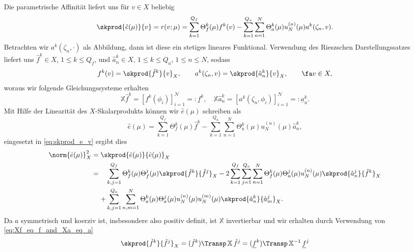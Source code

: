 Die parametrische Affinität liefert uns für $v \in X$ beliebig
\begin{equation}
    \label{eq:skprod_e_v}
    \skprod{\hat e(\mu)}{v} = r(v; \mu) = \sum_{k=1}^{Q_f} \Theta_f^k(\mu) f^k(v) - \sum_{k=1}^{Q_a} \sum_{n=1}^{N} \Theta_a^k(\mu) u_N^{(n)}(\mu)a^k(\zeta_n, v).
\end{equation}
Betrachten wir $a^k(\zeta_n, \cdot)$ als Abbildung, dann ist diese ein stetiges lineares Funktional. Verwendung des Rieszschen Darstellungssatzes liefert uns $\hat f^k \in X$, $1 \leq k \leq Q_f$, und $\hat a^k_n \in X$, $1 \leq k \leq Q_a$, $1 \leq n \leq N$, sodass
\begin{equation}
    f^k(v) = \skprod{\hat f^k}{v}_X, \qquad a^k(\zeta_n, v) = \skprod{\hat a^k_n}{v}_X, \qquad \fa v \in X,
\end{equation}
woraus wir folgende Gleichungssysteme erhalten
\begin{equation}
    \label{eq:Xf_eq_f_and_Xa_eq_a}
    \mathbb{X} \hat f^k = [f^k(\phi_i)]_{i=1}^{\mathcal N} =: \underline f^k, \quad \mathbb{X} \hat a^k_n = [a^k(\zeta_n, \phi_i)]_{i=1}^{\mathcal N} =: \underline a^k_n.
\end{equation}
Mit Hilfe der Linearität des $X$-Skalarprodukts können wir $\hat e(\mu)$ schreiben als
\begin{equation}
    \hat e(\mu) = \sum_{k=1}^{Q_f} \Theta_f^k(\mu) \hat f^k - \sum_{k=1}^{Q_a} \sum_{n=1}^{N} \Theta_a^k(\mu) u_N^{(n)}(\mu) \hat a^k_n,
\end{equation}
eingesetzt in \eqref{eq:skprod_e_v} ergibt dies
\begin{align}
    \label{eq:residumnorm}
    \norm{\hat e(\mu)}^2_X
    &= \skprod{\hat e(\mu)}{\hat e(\mu)}_X \\
    &=
    \begin{aligned}[t]
    &\sum_{k, j = 1}^{Q_f} \Theta_f^k(\mu) \Theta_f^j(\mu) \skprod{\hat f^k}{\hat f^j}_X - 2 \sum_{k = 1}^{Q_f} \sum_{j = 1}^{Q_a} \sum_{n = 1}^N \Theta_f^k(\mu) \Theta_a^j(\mu) u_N^{(n)}(\mu) \skprod{\hat a^j_n}{\hat f^k}_X \\
    + &\sum_{k, j = 1}^{Q_a} \sum_{n, m = 1}^N \Theta_a^k(\mu) \Theta_a^j(\mu) u_N^{(n)}(\mu)u_N^{(m)}(\mu) \skprod{\hat a_n^k}{\hat a_m^j}_X.
    \end{aligned}
\end{align}
Da $a$ symmetrisch und koerziv ist, insbesondere also positiv definit, ist $\mathbb{X}$ invertierbar und wir erhalten durch Verwendung von \eqref{eq:Xf_eq_f_and_Xa_eq_a}
\begin{equation}
    \skprod{\hat f^k}{\hat f^j}_X = (\hat f^k)\Transp \, \mathbb{X} \, \hat f^j = (\underline f^k)\Transp \, \mathbb{X}^{-1} \, \underline f^j
\end{equation}
